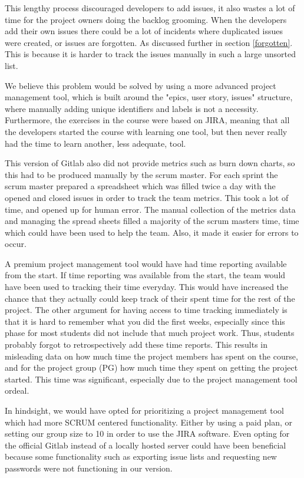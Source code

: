 \documentclass{article}
\begin{document}
This lengthy process discouraged developers to add issues, it also wastes a lot of time for the project owners doing the backlog grooming. When the developers add their own issues there could be a lot of incidents where duplicated issues were created, or issues are forgotten. As discussed further in section \ref{forgotten}. This is because it is harder to track the issues manually in such a large unsorted list.

We believe this problem would be solved by using a more advanced project management tool, which is built around the "epics, user story, issues" structure, where manually adding unique identifiers and labels is not a necessity. Furthermore, the exercises in the course were based on JIRA, meaning that all the developers started the course with learning one tool, but then never really had the time to  learn another, less adequate, tool.

This version of Gitlab also did not provide metrics such as burn down charts, so this had to be produced manually by the scrum master. For each sprint the scrum master prepared a spreadsheet which was filled twice a day with the opened and closed issues in order to track the team metrics. This took a lot of time, and opened up for human error. The manual collection of the metrics data and managing the spread sheets filled a majority of the scrum masters time, time which could have been used to help the team. Also, it made it easier for errors to occur.

A premium project management tool would have had time reporting available from the start. If time reporting was available from the start, the team would have been used to tracking their time everyday. This would have increased the chance that they actually could keep track of their spent time for the rest of the project. The other argument for having access to time tracking immediately is that it is hard to remember what you did the first weeks, especially since this phase for most students did not include that much project work. Thus, students probably forgot to retrospectively add these time reports. This results in misleading data on how much time the project members has spent on the course, and for the project group (PG) how much time they spent on getting the project started. This time was significant, especially due to the project management tool ordeal.  

In hindsight, we would have opted for prioritizing a project management tool which had more SCRUM centered functionality. Either by using a paid plan, or setting our group size to 10 in order to use the JIRA software. Even opting for the official Gitlab instead of a locally hosted server could have been beneficial because some functionality such as exporting issue lists and requesting new passwords were not functioning in our version.
\end{document}
